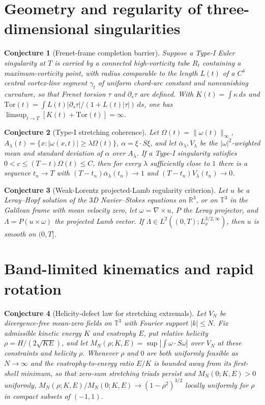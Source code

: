 \documentclass[11pt]{article}
\newtheorem{conjecture}{Conjecture}
\theoremstyle{definition}
\begin{document}
\section{Geometry and regularity of three-dimensional singularities}

\begin{conjecture}[Frenet-frame completion barrier]\label{al6}
Suppose a Type-I Euler singularity at $T$ is carried by a connected high-vorticity tube $R_t$ containing a maximum-vorticity point, with radius comparable to the length $L(t)$ of a $C^4$ central vortex-line segment $\gamma_t$ of uniform chord-arc constant and nonvanishing curvature, so that Frenet torsion $\tau$ and $\partial_s\tau$ are defined.  With $K(t)=\int\kappa\,ds$ and $\mathrm{Tor}(t)=\int L(t)|\partial_s\tau|/(1+L(t)|\tau|)\,ds$, one has $\limsup_{t\to T}[K(t)+\mathrm{Tor}(t)]=\infty$.
\end{conjecture}

\begin{conjecture}[Type-I stretching coherence]\label{al7}
Let $\Omega(t)=\|\omega(t)\|_\infty$, $A_\lambda(t)=\{x:|\omega(x,t)|\ge\lambda\Omega(t)\}$, $\alpha=\xi\cdot S\xi$, and let $\bar\alpha_\lambda,V_\lambda$ be the $|\omega|^2$-weighted mean and standard deviation of $\alpha$ over $A_\lambda$.  If a Type-I singularity satisfies $0<c\le(T-t)\Omega(t)\le C$, then for every $\lambda$ sufficiently close to $1$ there is a sequence $t_n\to T$ with $(T-t_n)\bar\alpha_\lambda(t_n)\to1$ and $(T-t_n)V_\lambda(t_n)\to0$.
\end{conjecture}

\begin{conjecture}[Weak-Lorentz projected-Lamb regularity criterion]\label{al8}
Let $u$ be a Leray--Hopf solution of the $3$D Navier--Stokes equations on $\mathbb R^3$, or on $\mathbb T^3$ in the Galilean frame with mean velocity zero, let $\omega=\nabla\times u$, $P$ the Leray projector, and $\Lambda=P(u\times\omega)$ the projected Lamb vector.  If $\Lambda\in L^2((0,T);L^{3/2,\infty}_x)$, then $u$ is smooth on $(0,T]$.
\end{conjecture}

\section{Band-limited kinematics and rapid rotation}

\begin{conjecture}[Helicity-defect law for stretching extremals]\label{al9}
Let $V_N$ be divergence-free mean-zero fields on $\mathbb T^3$ with Fourier support $|k|\le N$.  Fix admissible kinetic energy $K$ and enstrophy $E$, put relative helicity $\rho=H/(2\sqrt{KE})$, and let $M_N(\rho;K,E)=\sup|\int\omega\cdot S\omega|$ over $V_N$ at these constraints and helicity $\rho$.  Whenever $\rho$ and $0$ are both uniformly feasible as $N\to\infty$ and the enstrophy-to-energy ratio $E/K$ is bounded away from its first-shell minimum, so that zero-sum stretching triads persist and $M_N(0;K,E)>0$ uniformly, $M_N(\rho;K,E)/M_N(0;K,E)\to(1-\rho^2)^{3/2}$ locally uniformly for $\rho$ in compact subsets of $(-1,1)$.
\end{conjecture}
\end{document}
